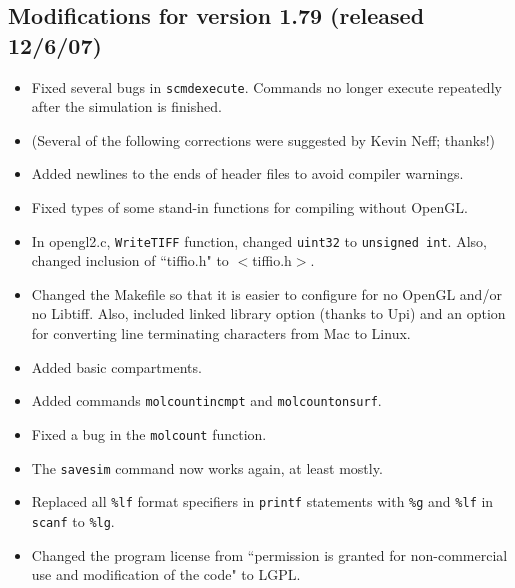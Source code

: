 \documentclass {scrbook}
\newcommand {\ttt} {\texttt}
\begin{document}
\subsection{Modifications for version 1.79 (released 12/6/07)}
\begin{itemize}
\item Fixed several bugs in \ttt{scmdexecute}. Commands no longer execute repeatedly after the simulation is finished.
\item (Several of the following corrections were suggested by Kevin Neff; thanks!)
\item Added newlines to the ends of header files to avoid compiler warnings.
\item Fixed types of some stand-in functions for compiling without OpenGL.
\item In opengl2.c, \ttt{WriteTIFF} function, changed \ttt{uint32} to \ttt{unsigned int}. Also, changed inclusion of ``tiffio.h" to $<$tiffio.h$>$.
\item Changed the Makefile so that it is easier to configure for no OpenGL and/or no Libtiff. Also, included linked library option (thanks to Upi) and an option for converting line terminating characters from Mac to Linux.
\item Added basic compartments.
\item Added commands \ttt{molcountincmpt} and \ttt{molcountonsurf}.
\item Fixed a bug in the \ttt{molcount} function.
\item The \ttt{savesim} command now works again, at least mostly.
\item Replaced all \ttt{\%lf} format specifiers in \ttt{printf} statements with \ttt{\%g} and \ttt{\%lf} in \ttt{scanf} to \ttt{\%lg}.
\item Changed the program license from ``permission is granted for non-commercial use and modification of the code" to LGPL.
\end{itemize}
\end{document}
